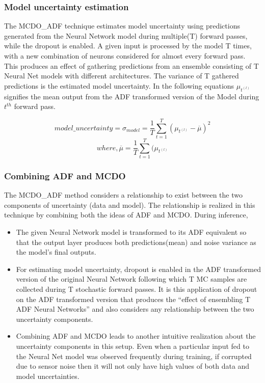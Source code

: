 	\subsubsection{Model uncertainty estimation}
	The MCDO\_ADF technique estimates model uncertainty using predictions generated from the Neural Network model during multiple(T) forward passes, while the dropout is enabled. A given input is processed by the model T times, with a new combination of neurons considered for almost every forward pass. This produces an effect of gathering predictions from an ensemble consisting of T Neural Net models with different architectures. The variance of T gathered predictions is the estimated model uncertainty. In the following equations $\mu_{t^{(l)}}$ signifies the mean output from the ADF transformed version of the Model during $t^{th}$ forward pass.
	
	\begin{equation}
		model\_uncertainty = \sigma_{model} =  \frac{1}{T}\sum_{t=1}^{T}(\mu_{t^{(l)}}-\overline{\mu})^2
	\end{equation}
	\begin{equation} 
		where, \overline{\mu} = \frac{1}{T}\sum_{t=1}^{T}(\mu_{t^{(l)}} 
	\end{equation}
	\subsubsection{Combining ADF and MCDO}
	The MCDO\_ADF method considers a relationship to exist between the two components of uncertainty (data and model). The relationship  is realized in this technique by combining both the ideas of ADF and MCDO. During inference,  
	\begin{itemize}
		\item The given Neural Network model is transformed to its ADF equivalent so that the output layer produces both predictions(mean) and noise variance as the model's final outputs.
		\item For estimating model uncertainty,  dropout is enabled in the ADF transformed version of the original Neural Network following which T MC samples are collected during T stochastic forward passes. It is this application of dropout on the ADF transformed version that produces the \enquote{effect of ensembling T ADF Neural Networks} and also considers any relationship between the two uncertainty components.
		\item Combining ADF and MCDO leads to another intuitive realization about the uncertainty components in this setup. Even when a particular input fed to the Neural Net model was observed frequently during training, if corrupted due to sensor noise then it will not only have high values of both data and model uncertainties. 
		
	\end{itemize}
	
